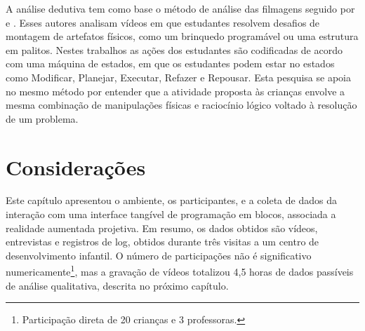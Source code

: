 
A análise dedutiva tem como base o método de análise das filmagens seguido por  e . Esses autores analisam vídeos em que estudantes resolvem desafios de montagem de artefatos físicos, como um brinquedo programável ou uma estrutura em palitos. Nestes trabalhos as ações dos estudantes são codificadas de acordo com uma máquina de estados, em que os estudantes podem estar no estados como Modificar, Planejar, Executar, Refazer e Repousar. Esta pesquisa se apoia no mesmo método por entender que a atividade proposta às crianças envolve a mesma combinação de manipulações físicas e raciocínio lógico voltado à resolução de um problema.

\section{Considerações}

Este capítulo apresentou o ambiente, os participantes, e a coleta de dados da interação com uma interface tangível de programação em blocos, associada a realidade aumentada projetiva. Em resumo, os dados obtidos são vídeos, entrevistas e registros de log, obtidos durante três visitas a um centro de desenvolvimento infantil. O número de participações não é significativo numericamente\footnote{Participação direta de 20 crianças e 3 professoras.}, mas a gravação de vídeos totalizou 4,5 horas de dados passíveis de análise qualitativa, descrita no próximo capítulo.